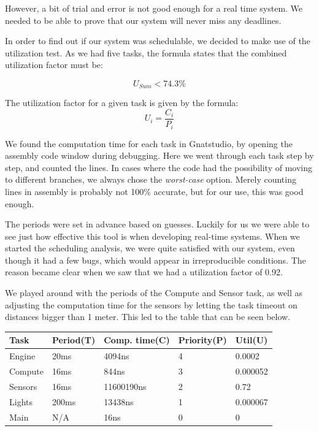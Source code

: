 \documentclass{article}
\begin{document}
However, a bit of trial and error is not good enough for a real time system. We needed to be able to prove that our system will never miss any deadlines.

In order to find out if our system was schedulable, we decided to make use of the utilization test. As we had five tasks, the formula states that the combined utilization factor must be:

\begin{equation*}
  U_{Sum} < 74.3\%
\end{equation*}

The utilization factor for a given task is given by the formula:
\begin{equation*}
  U_{i} = \frac{C_{i}}{P_{i}}
\end{equation*}

We found the computation time for each task in Gnatstudio, by opening the assembly code window during debugging. Here we went through each task step by step, and counted the lines. In cases where the code had the possibility of moving to different branches, we always chose the \textit{worst-case} option. Merely counting lines in assembly is probably not 100\% accurate, but for our use, this was good enough.

The periods were set in advance based on guesses. Luckily for us we were able to see just how effective this tool is when developing real-time systems. When we started the scheduling analysis, we were quite satisfied with our system, even though it had a few bugs, which would appear in irreproducible conditions. The reason became clear when we saw that we had a utilization factor of 0.92.

We played around with the periods of the Compute and Sensor task, as well as adjusting the computation time for the sensors by letting the task timeout on distances bigger than 1 meter. This led to the table that can be seen below.

\begin{center}
 \begin{tabular}{||l l l l|l||}
 \hline
   Task & Period(T) & Comp. time(C) & Priority(P) & Util(U) \\ [0.5ex]
 \hline\hline
   Engine & 20ms & 4094ns & 4 & 0.0002 \\
 \hline
   Compute & 16ms & 844ns & 3 & 0.000052 \\
 \hline
   Sensors & 16ms & 11600190ns & 2 & 0.72 \\
 \hline
   Lights & 200ms & 13438ns & 1 & 0.000067 \\
 \hline
   Main & N/A & 16ns & 0 & 0 \\ [1ex]
 \hline
\end{tabular}
\end{center}
\end{document}
